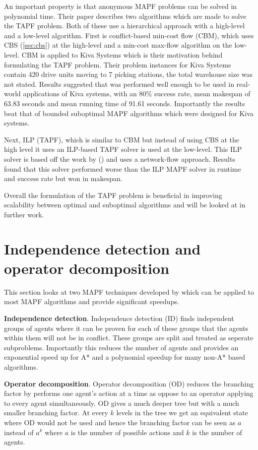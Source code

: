 \documentclass[a4paper,11pt]{article}
\begin{document}
An important property is that anonymous MAPF problems can be solved in polynomial time. Their paper describes two algorithms which are made to solve the TAPF problem. Both of these use a hierarchical approach with a high-level and a low-level algorithm. First is conflict-based min-cost flow (CBM), which uses CBS (\ref{sec:cbs}) at the high-level and a min-cost max-flow algorithm on the low-level. CBM is applied to Kiva Systems which is their motivation behind formulating the TAPF problem. Their problem instances for Kiva Systems contain 420 drive units moving to 7 picking stations, the total warehouse size was not stated. Results suggested that  was performed well enough to be used in real-world applications of Kiva systems, with an 80\% success rate, mean makespan of 63.83 seconds and mean running time of 91.61 seconds. Importantly the results beat that of bounded suboptimal MAPF algorithms which were designed for Kiva systems.

Next, ILP (TAPF), which is similar to CBM but instead of using CBS at the high level it uses an ILP-based TAPF solver is used at the low-level. This ILP solver is based off the work by (\cite{yu2013multi}) and uses a network-flow approach. Results found that this solver performed worse than the ILP MAPF solver in runtime and success rate but won in makespan.

Overall the formulation of the TAPF problem is beneficial in improving scalability between optimal and suboptimal algorithms and will be looked at in further work.

\section{Independence detection and operator decomposition} \label{sec:generalimprovements}
This section looks at two MAPF techniques developed by \cite{standley2010finding} which can be applied to most MAPF algorithms and provide significant speedups.

\noindent \textbf{Independence detection}. Independence detection (ID) finds independent groups of agents where it can be proven for each of these groups that the agents within them will not be in conflict. These groups are split and treated as seperate subproblems. Importantly this reduces the number of agents and provides an exponential speed up for A* and a polynomial speedup for many non-A* based algorithms.

\noindent \textbf{Operator decomposition}. Operator decomposition (OD) reduces the branching factor by performs one agent's action at a time as oppose to an operator applying to every agent simultaneously. OD gives a much deeper tree but with a much smaller branching factor. At every $k$ levels in the tree we get an equivalent state where OD would not be used and hence the branching factor can be seen as $a$ instead of $a^k$ where $a$ is the number of possible actions and $k$ is the number of agents.
\end{document}
